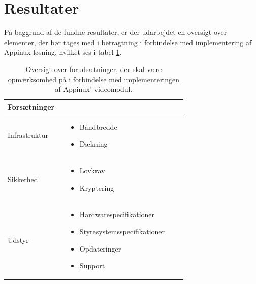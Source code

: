 \section{Resultater}
På baggrund af de fundne resultater, er der udarbejdet en oversigt over elementer, der bør tages med i betragtning i forbindelse med implementering af Appinux løsning, hvilket ses i tabel \ref{tab:tabelforud}.
\begin{table}[H]
\caption{Oversigt over forudsætninger, der skal være opmærksomhed på i forbindelse med implementeringen af Appinux' videomodul.}
\centering
\label{tab:tabelforud}
\begin{tabular}{|p{0.2\linewidth}m{0.5\linewidth}|}
\hline
\cellcolor{blue!25} \textbf{Forsætninger} &\cellcolor{blue!25}\\ \hline
Infrastruktur & \begin{itemize}\item Båndbredde\item Dækning \end{itemize}\\ \hline
Sikkerhed & \begin{itemize}\item Lovkrav\item Kryptering \end{itemize}\\ \hline
Udstyr & \begin{itemize}\item Hardwarespecifikationer \item Styresystemsspecifikationer \item Opdateringer \item Support \end{itemize}\\ \hline
\end{tabular}

\end{table}
